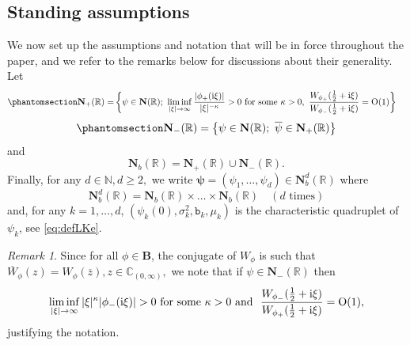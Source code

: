 \documentclass[12pt]{amsart}
\newcommand{\hlabel}{\phantomsection\label}
\numberwithin{equation}{section}
\newcommand{\bb}{\mathbb}
\renewcommand{\geq}{\geqslant}
\newcommand{\ov}{\overline}
\newcommand{\ttt}{\mathtt}
\newcommand{\B}{\mathbf{B}}
\theoremstyle{definition}
\theoremstyle{assump}
\theoremstyle{remark}
\newtheorem{rem}[thm]{Remark}
\begin{document}
\subsection{Standing assumptions}
We now set up the assumptions and notation that will be in force throughout the paper, and we refer to the remarks below for discussions about their generality.
Let
\begin{align}\hlabel{N_+}
 \mathbf{N}_+(\bb{R})=
&\left\{\psi\in\mathbf{N}(\bb{R});  \ \liminf_{|\xi|\to\infty}\frac{|\phi_+({\rm{i}}\xi  )|}{|\xi|^{-\kappa}}>0 \ \mbox{for some $\kappa>0$},  \ \frac{W_{\phi_+}(\frac{1}{2}+{\rm{i}}\xi  )}{W_{\phi_-}(\frac{1}{2}+{\rm{i}}\xi  )}={\rm{O}}(1)\right\}
 \end{align}
\begin{align}\hlabel{N_-}
\mathbf{N}_-(\bb{R})=\left\{\psi\in\mathbf{N}(\bb{R});  \ \ov{\psi}\in\mathbf{N}_+(\bb{R})\right\}
\end{align} and
\begin{equation} \label{eq:defNb}\mathbf{N}_b(\bb{R})=\mathbf{N}_+(\bb{R})\cup\mathbf{N}_-(\bb{R}).
\end{equation}
Finally, for any $d\in \mathbb{N}, d\geq2,$ we write  $\bm{\psi}=(\psi_1,\ldots,\psi_d)\in\mathbf{N}^d_b(\bb{R})$ where
\begin{equation} \label{eq:defNbd}
\mathbf{N}^d_b(\bb{R})=\mathbf{N}_b(\bb{R})\times \ldots \times \mathbf{N}_b(\bb{R}) \quad (d \textrm{ times})
\end{equation}
and, for any $k=1,\ldots,d$, $(\psi_k(0),\sigma_k^2,\ttt{b}_k,\mu_k)$ is the characteristic quadruplet of $\psi_k$, see \eqref{eq:defLKe}.
  \begin{rem}
Since for all $\phi\in\B$, the conjugate of $W_\phi$ is such that $\ov{W}_{\!\phi}(z)=W_\phi(\ov{z}), z\in\bb{C}_{(0,\infty)},$  we note that if $\psi\in\mathbf{N}_-(\bb{R})$ then  \[ \liminf\limits_{|\xi|\to\infty}{{|\xi|^{\kappa}}|\phi_-({\rm{i}}\xi  )|}>0 \ \mbox{for some $\kappa>0$ and }   \ \frac{W_{\phi_-}(\frac{1}{2}+{\rm{i}}\xi  )}{W_{\phi_+}(\frac{1}{2}+{\rm{i}}\xi  )}={\rm{O}}(1), \]
justifying the notation.
\end{rem}
\end{document}
